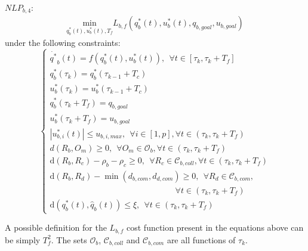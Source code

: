 \documentclass[12pt]{book}
\numberwithin{equation}{section}
\begin{document}
$NLP_{b,4}$:
\begin{align}\label{eq:cost}
\underset{q^*_b(t),u^*_b(t),T_f}{\mathrm{min}} L_{b,f}(q^*_b(t), u^*_b(t), q_{b,goal},u_{b,goal})
\end{align}
under the following constraints:
\begin{equation}\label{eq:const}
\left\lbrace\begin{array}{lcl}
    \dot{q^*}_b(t) = f(q^*_b(t),u^*_b(t)),\ \ \forall t \in [\tau_{k}, \tau_{k}+T_f]\\
    q^*_b(\tau_{k}) = q^*_{b}(\tau_{k-1}+T_c)\\
    u^*_b(\tau_{k}) = u^*_{b}(\tau_{k-1}+T_c)\\
    q^*_b(\tau_{k}+T_f) = q_{b,goal}\\
    u^*_b(\tau_{k}+T_f) = u_{b,goal}\\
    |u^*_{b,i}(t)| \leq u_{b,i,max},\ \ \forall i \in [1,p],\forall t \in (\tau_{k}, \tau_{k}+T_f)\\
    d(R_b, O_m) \geq 0,\ \ \forall O_m \in \mathcal{O}_b, \forall t \in (\tau_{k}, \tau_{k}+T_f)\\
    \mathrm{d}(R_b, R_c) - \rho_b - \rho_c \geq 0,\ \ \forall R_c \in \mathcal{C}_{b,coll}, \forall t \in (\tau_{k}, \tau_{k}+T_f)\\
    \mathrm{d}(R_b, R_d) - \min(d_{b,com},d_{d,com}) \geq 0,\ \ \forall R_d \in \mathcal{C}_{b,com},\\
    \quad \quad \quad \quad \quad \quad \quad \quad \quad \quad \quad \quad \quad \quad \quad \forall t \in (\tau_{k}, \tau_{k}+T_f)\\
    \mathrm{d}(q^*_b(t), \hat{q}_b(t)) \leq \xi,\ \ \forall t \in (\tau_{k}, \tau_{k}+T_f)
\end{array}\right.
\end{equation}

A possible definition for the $L_{b,f}$ cost function present in the equations above can be simply $T_f^2$.
The sets $\mathcal{O}_b$, $\mathcal{C}_{b,coll}$ and $\mathcal{C}_{b,com}$ are all functions of
$\tau_k$.
\end{document}

